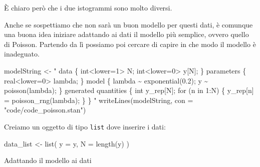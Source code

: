 \documentclass[
]{memoir}
\newenvironment{Shaded}{\begin{snugshade}}{\end{snugshade}}
\newcommand{\AttributeTok}[1]{\textcolor[rgb]{0.77,0.63,0.00}{#1}}
\newcommand{\DecValTok}[1]{\textcolor[rgb]{0.00,0.00,0.81}{#1}}
\newcommand{\FunctionTok}[1]{\textcolor[rgb]{0.00,0.00,0.00}{#1}}
\newcommand{\NormalTok}[1]{#1}
\newcommand{\OtherTok}[1]{\textcolor[rgb]{0.56,0.35,0.01}{#1}}
\newcommand{\SpecialCharTok}[1]{\textcolor[rgb]{0.00,0.00,0.00}{#1}}
\newcommand{\StringTok}[1]{\textcolor[rgb]{0.31,0.60,0.02}{#1}}
\theoremstyle{definition}
\theoremstyle{definition}
\theoremstyle{definition}
\theoremstyle{definition}
\theoremstyle{remark}
\begin{document}
\noindent
È chiaro però che i due istogrammi sono molto diversi.

Anche se sospettiamo che non sarà un buon modello per questi dati, è comunque una buona idea iniziare adattando ai dati il modello più semplice, ovvero quello di Poisson. Partendo da lì possiamo poi cercare di capire in che modo il modello è inadeguato.

\begin{Shaded}
\begin{Highlighting}[]
\NormalTok{modelString }\OtherTok{\textless{}{-}} \StringTok{"}
\StringTok{data \{}
\StringTok{  int\textless{}lower=1\textgreater{} N;}
\StringTok{  int\textless{}lower=0\textgreater{} y[N];}
\StringTok{\}}
\StringTok{parameters \{}
\StringTok{  real\textless{}lower=0\textgreater{} lambda;}
\StringTok{\}}
\StringTok{model \{}
\StringTok{  lambda \textasciitilde{} exponential(0.2);}
\StringTok{  y \textasciitilde{} poisson(lambda);}
\StringTok{\}}
\StringTok{generated quantities \{}
\StringTok{  int y\_rep[N];}
\StringTok{  for (n in 1:N) \{}
\StringTok{    y\_rep[n] = poisson\_rng(lambda);}
\StringTok{  \}}
\StringTok{\}}
\StringTok{"}
\FunctionTok{writeLines}\NormalTok{(modelString, }\AttributeTok{con =} \StringTok{"code/code\_poisson.stan"}\NormalTok{)}
\end{Highlighting}
\end{Shaded}

\noindent
Creiamo un oggetto di tipo \texttt{list} dove inserire i dati:

\begin{Shaded}
\begin{Highlighting}[]
\NormalTok{data\_list }\OtherTok{\textless{}{-}} \FunctionTok{list}\NormalTok{(}
  \AttributeTok{y =}\NormalTok{ y,}
  \AttributeTok{N =} \FunctionTok{length}\NormalTok{(y)}
\NormalTok{)}
\end{Highlighting}
\end{Shaded}

\noindent
Adattando il modello ai dati

\begin{Shaded}
\end{Shaded}
\end{document}
